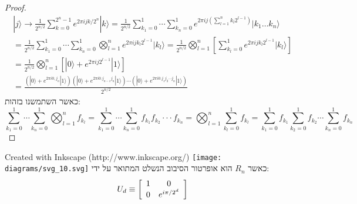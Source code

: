 \documentclass{tstextbook}
\begin{document}
\begin{proof}
$$\begin{gather}|j\rangle \rightarrow \frac{1}{2^{n/2}} \sum_{k=0}^{2^n-1} e^{2\pi ijk/2^n} |k\rangle = \frac{1}{2^{n/2}} \sum_{k_1=0}^1 \cdots \sum_{k_n=0}^1 e^{2\pi ij (\sum_{l=1}^n k_l 2^{l-1})} |k_1 \dots k_n\rangle \\= \frac{1}{2^{n/2}} \sum_{k_1=0}^1 \cdots \sum_{k_n=0}^1 \bigotimes_{l=1}^n e^{2\pi ijk_l 2^{l-1}} |k_l\rangle = \frac{1}{2^{n/2}} \bigotimes_{l=1}^n \left[ \sum_{k_l=0}^1 e^{2\pi ijk_l 2^{l-1}} |k_l\rangle \right] \\= \frac{1}{2^{n/2}} \bigotimes_{l=1}^n \left[ |0\rangle + e^{2\pi ij2^{l-1}} |1\rangle \right] \\= \frac{(|0\rangle + e^{2\pi i0,j_n} |1\rangle)(|0\rangle + e^{2\pi i0.j_{n-1}j_n} |1\rangle) \cdots (|0\rangle + e^{2\pi i0.j_1j_2\cdots j_n} |1\rangle)}{2^{n/2}}
\end{gather}$$
כאשר השתמשנו בזהות:
$$\sum_{k_{1}=0}^{1}\cdots\sum_{k_{n}=0}^{1}\bigotimes_{l=1}^{n}f_{k_{l}}=\sum_{k_{1}=0}^{1}\cdots\sum_{k_{n}=0}^{1}f_{k_{1}}f_{k_{2}}\cdot\cdot\cdot f_{k_{n}}=\bigotimes_{l=1}^{n}\sum_{k_{l}=0}^{1}f_{k_{l}}=\sum_{k_{1}=0}^{1}f_{k_{1}}\sum_{k_{2}=0}^{1}f_{k_{2}}\cdots\sum_{k_{n}=0}^{1}f_{k_{n}}$$

\end{proof}
 Created with Inkscape (http://www.inkscape.org/) \texttt{[image: diagrams/svg\_10.svg]}
כאשר \(R_{n}\) הוא אופרטור הסיבוב הנשלט המתואר על ידי:
$$U_{d}\equiv\left[\begin{array}{c c}{{1}}&{{0}}\\ {{0}}&{{e^{i\pi/2^{d}}}}\end{array}\right]$$
\end{document}
